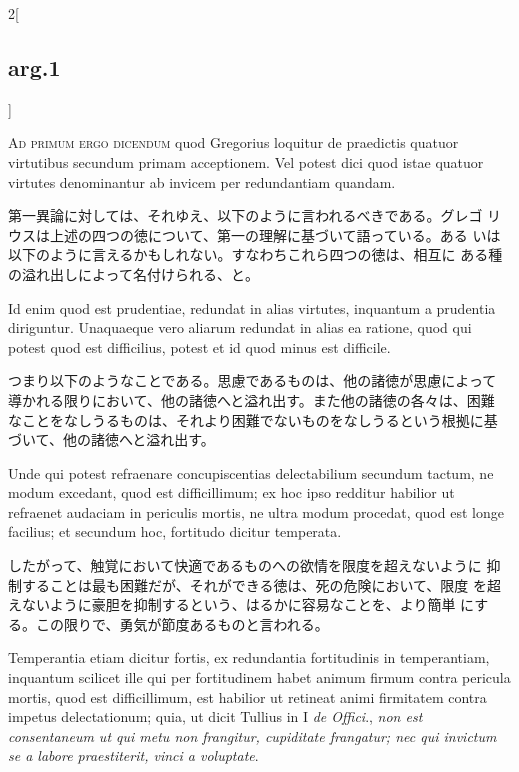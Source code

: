 \documentclass[paper=a4paper,fontsize=10pt,jafontsize=9pt,titlepage]{jlreq}
\begin{document}
\begin{paracol}{2}[\subsection{arg.1}]
\switchcolumn*[\subsection{ad.1}]

{\scshape Ad primum ergo dicendum} quod Gregorius loquitur de
praedictis quatuor virtutibus secundum primam acceptionem. Vel potest
dici quod istae quatuor virtutes denominantur ab invicem per
 redundantiam quandam.

\switchcolumn

第一異論に対しては、それゆえ、以下のように言われるべきである。グレゴ
 リウスは上述の四つの徳について、第一の理解に基づいて語っている。ある
 いは以下のように言えるかもしれない。すなわちこれら四つの徳は、相互に
 ある種の溢れ出しによって名付けられる、と。

\switchcolumn*

Id enim quod est prudentiae, redundat in alias virtutes, inquantum a
prudentia diriguntur. Unaquaeque vero aliarum redundat in alias ea
ratione, quod qui potest quod est difficilius, potest et id quod minus
est difficile.

\switchcolumn

つまり以下のようなことである。思慮であるものは、他の諸徳が思慮によって
導かれる限りにおいて、他の諸徳へと溢れ出す。また他の諸徳の各々は、困難
なことをなしうるものは、それより困難でないものをなしうるという根拠に基
づいて、他の諸徳へと溢れ出す。

\switchcolumn*

Unde qui potest refraenare
concupiscentias delectabilium secundum tactum, ne modum excedant, quod
est difficillimum; ex hoc ipso redditur habilior ut refraenet audaciam
in periculis mortis, ne ultra modum procedat, quod est longe facilius;
 et secundum hoc, fortitudo dicitur temperata.

\switchcolumn

したがって、触覚において快適であるものへの欲情を限度を超えないように
 抑制することは最も困難だが、それができる徳は、死の危険において、限度
 を超えないように豪胆を抑制するという、はるかに容易なことを、より簡単
 にする。この限りで、勇気が節度あるものと言われる。

\switchcolumn*

Temperantia etiam dicitur fortis, ex redundantia fortitudinis in
temperantiam, inquantum scilicet ille qui per fortitudinem habet
animum firmum contra pericula mortis, quod est difficillimum, est
habilior ut retineat animi firmitatem contra impetus delectationum;
quia, ut dicit Tullius in I {\itshape de Offici}., {\itshape non est
consentaneum ut qui metu non frangitur, cupiditate frangatur; nec qui
invictum se a labore praestiterit, vinci a voluptate}.


\end{paracol}
\end{document}
